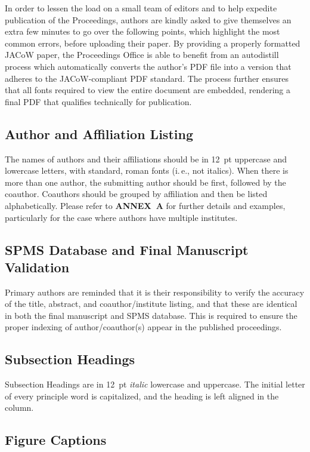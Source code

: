 In order to lessen the load on a small team of editors
and to help expedite publication of the Proceedings, authors
are kindly asked to give themselves an extra few
minutes to go over the following points, which highlight
the most common errors, before uploading their paper. By
providing a properly formatted JACoW paper, the Proceedings
Office is able to benefit from an autodistill process
which automatically converts the author's PDF file
into a version that adheres to the JACoW-compliant PDF
standard. The process further ensures that all fonts required
to view the entire document are embedded, rendering
a final PDF that qualifies technically for publication.


\subsection{Author and Affiliation Listing}

The names of authors and their affiliations should be in
\SI{12}{pt} uppercase and lowercase letters, with standard,
roman fonts (i.\,e., not italics). When there is more than
one author, the submitting author should be first, followed
by the coauthor. Coauthors should be grouped by affiliation
and then be listed alphabetically. Please refer to \textbf{ANNEX~A}
for further details and examples, particularly for
the case where authors have multiple institutes.

\subsection{SPMS Database and Final Manuscript Validation}

Primary authors are reminded that it is their
responsibility to verify the accuracy of the title, abstract,
and coauthor/institute listing, and that these are identical
in both the final manuscript and SPMS database. This is
required to ensure the proper indexing of author/coauthor(s) 
appear in the published proceedings.

\subsection{Subsection Headings}

Subsection Headings are in \SI{12}{pt} \emph{italic} lowercase and uppercase.
The initial letter of every principle word is capitalized,
and the heading is left aligned in the column.

\subsection{Figure Captions}

